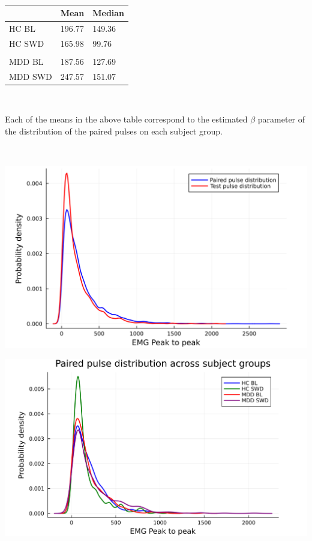 \documentclass{article}
\begin{document}
\begin{multicols}{2}
~

    \begin{tabular}{ |p{2cm}|p{2cm}|p{2cm}|  }
    \hline
    &       Mean & Median \\
    \hline
    HC BL & 196.77 & 149.36 \\
    \hline
    HC SWD & 165.98 & 99.76 \\
    \hline \\ 
    MDD BL & 187.56 & 127.69\\ 
    \hline 
    MDD SWD & 247.57 & 151.07 \\
    \hline
    \end{tabular}

~ 

Each of the means in the above table correspond to the estimated $\beta$
parameter of the distribution of the paired pulses on each subject group.

\end{multicols}
\raggedright

~

\includegraphics[scale=0.14]{Paired-TestDist}
\raggedright
\includegraphics[scale=0.14]{P-dist-subjects-big}
\end{document}
